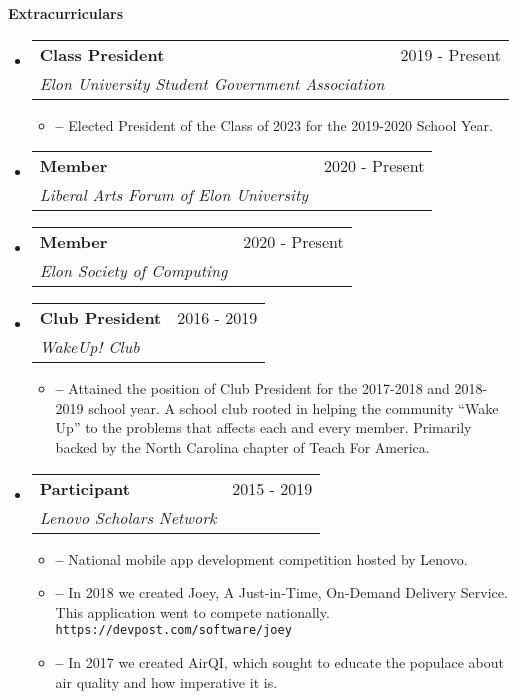 \documentclass[letterpaper,10pt,draft]{article}
\makeatletter
\newlength{\outerbordwidth}
\newcommand{\resitem}[1]{\item[] \textbf{--} #1 \vspace{-2pt}}
\newcommand{\resheading}[1]{\vspace{8pt}
  {\setlength{\FrameSep}{\outerbordwidth}
    
\textbf{\large #1}
    
  }
}
\newcommand{\ressubheading}[3]{
\begin{tabular*}{6.5in}{l@{\cftdotfill{\cftsecdotsep}\extracolsep{\fill}}r}
		\textbf{#1} & #3\\
		\textit{#2} \\
\end{tabular*}\vspace{-6pt}}
\makeatother
\begin{document}
\resheading{Extracurriculars}

\begin{itemize}
	\item[]
		\ressubheading{Class President}{Elon University Student Government Association}{2019 - Present}
		\begin{itemize}
			\resitem{Elected President of the Class of 2023 for the 2019-2020 School Year.}
		\end{itemize}

	\item[] 
		\ressubheading{Member}{Liberal Arts Forum of Elon University}{2020 - Present}
	
	\item[]
		\ressubheading{Member}{Elon Society of Computing}{2020 - Present}

	\item[] 
		\ressubheading{Club President}{WakeUp! Club}{2016 - 2019}

		\begin{itemize}

			\resitem{Attained the position of Club President for the 2017-2018 and 2018-2019 school year. A school club rooted in helping the community “Wake Up” to the problems that affects each and every member. Primarily backed by the North Carolina chapter of Teach For America.}

		\end{itemize}

	\item[]  
		\ressubheading{Participant}{Lenovo Scholars Network}{2015 - 2019}

		\begin{itemize}

			\resitem{National mobile app development competition hosted by Lenovo.}

			\resitem{In 2018 we created Joey, A Just-in-Time, On-Demand Delivery Service. This application went to compete nationally. \texttt{https://devpost.com/software/joey}}

			\resitem{In 2017 we created AirQI, which sought to educate the populace about air quality and how imperative it is.}

		\end{itemize}

\end{itemize}
\end{document}
